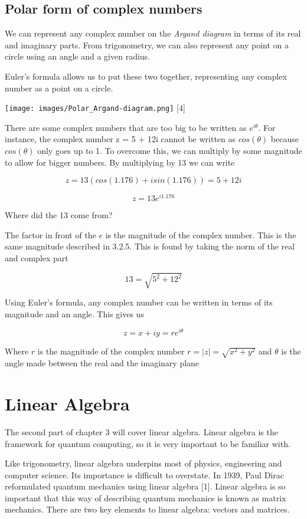 \documentclass{book}
\begin{document}
\subsection{ Polar form of complex numbers}

We can represent any complex number on the \textit{Argand diagram} in terms of its real and imaginary parts. From trigonometry, we can also represent any point on a circle using an angle and a given radius. 

Euler's formula allows us to put these two together, representing any complex number as a point on a circle. 

\texttt{[image: images/Polar\_Argand-diagram.png]}
[4]

There are some complex numbers that are too big to be written as $e^{i\theta}$. For instance, the complex number z = 5 + 12i cannot be written as $cos(\theta)$ because $cos(\theta)$ only goes up to 1. To overcome this, we can multiply by some magnitude to allow for bigger numbers. By multiplying by 13 we can write 

$$ z = 13(cos(1.176) + i sin(1.176) )= 5 + 12i $$

$$ z = 13e^{i 1.176}$$

Where did the 13 come from? 

The factor in front of the $e$ is the magnitude of the complex number. This is the same magnitude described in 3.2.5. This is found by taking the norm of the real and complex part 

$$ 13 = \sqrt{ 5^2 + 12^2} $$

Using Euler's formula, any complex number can be written in terms of its magnitude and an angle. This gives us 

$$z = x + iy = re^{i\theta}$$ 

Where $r$ is the magnitude of the complex number $r = |z| = \sqrt{x^2 + y^2}$ and $\theta$ is the angle made between the real and the imaginary plane

\section{Linear Algebra}

The second part of chapter 3 will cover linear algebra. Linear algebra is the framework for quantum computing, so it is very important to be familiar with. 

Like trigonometry, linear algebra underpins most of physics, engineering and computer science. Its importance is difficult to overstate. In 1939, Paul Dirac reformulated quantum mechanics using linear algebra [1]. Linear algebra is so important that this way of describing quantum mechanics is known as matrix mechanics. There are two key elements to linear algebra: vectors and matrices. 
\end{document}
